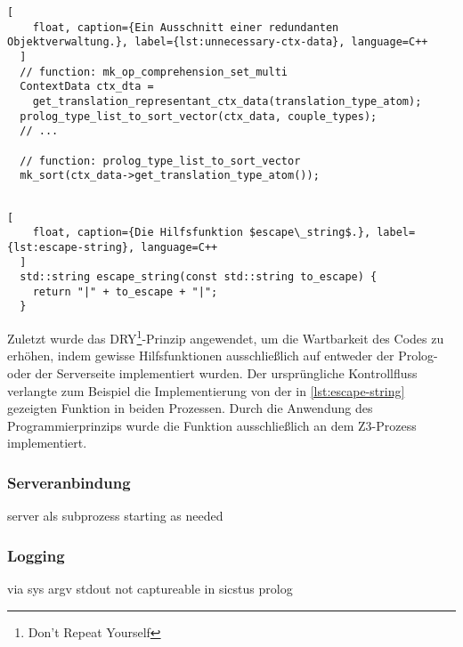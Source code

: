 \begin{lstlisting}[
    float, caption={Ein Ausschnitt einer redundanten Objektverwaltung.}, label={lst:unnecessary-ctx-data}, language=C++
  ]
  // function: mk_op_comprehension_set_multi
  ContextData ctx_dta =
    get_translation_representant_ctx_data(translation_type_atom);
  prolog_type_list_to_sort_vector(ctx_data, couple_types);
  // ...
  
  // function: prolog_type_list_to_sort_vector
  mk_sort(ctx_data->get_translation_type_atom());
  
\end{lstlisting}

\begin{lstlisting}[
    float, caption={Die Hilfsfunktion $escape\_string$.}, label={lst:escape-string}, language=C++
  ]
  std::string escape_string(const std::string to_escape) {
    return "|" + to_escape + "|";
  }
\end{lstlisting}

Zuletzt wurde das DRY\footnote{Don't Repeat Yourself}-Prinzip angewendet, um die Wartbarkeit des Codes zu erhöhen,
indem gewisse Hilfsfunktionen ausschließlich auf entweder der Prolog- oder der Serverseite implementiert wurden.
Der ursprüngliche Kontrollfluss verlangte zum Beispiel die Implementierung von der in \cref{lst:escape-string} gezeigten Funktion
in beiden Prozessen. Durch die Anwendung des Programmierprinzips wurde die Funktion ausschließlich an dem Z3-Prozess implementiert.


\subsubsection{Serveranbindung}

server als subprozess
starting as needed

\subsubsection{Logging}

via sys argv
stdout not captureable in sicstus prolog



